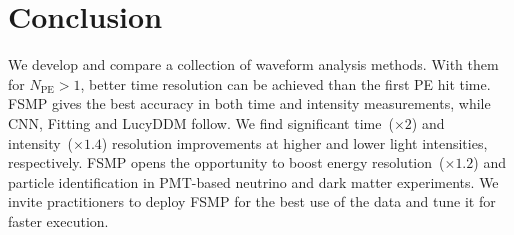\section{Conclusion}
\label{sec:conclusion}

We develop and compare a collection of waveform analysis methods.  With them for $N_\mathrm{PE} > 1$, better time resolution can be achieved than the first PE hit time.  FSMP gives the best accuracy in both time and intensity measurements, while CNN, Fitting and LucyDDM follow.  We find significant time~($\times 2$) and intensity~($\times 1.4$) resolution improvements at higher and lower light intensities, respectively.    FSMP opens the opportunity to boost energy resolution~($\times 1.2$) and particle identification in PMT-based neutrino and dark matter experiments.  We invite practitioners to deploy FSMP for the best use of the data and tune it for faster execution.
